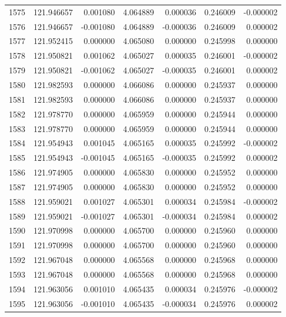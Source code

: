 \begin{tabular}{rrrrrrr}
1575 & 121.946657 &    0.001080 &  4.064889 &   0.000036 &   0.246009 & -0.000002 \\
1576 & 121.946657 &   -0.001080 &  4.064889 &  -0.000036 &   0.246009 &  0.000002 \\
1577 & 121.952415 &    0.000000 &  4.065080 &   0.000000 &   0.245998 &  0.000000 \\
1578 & 121.950821 &    0.001062 &  4.065027 &   0.000035 &   0.246001 & -0.000002 \\
1579 & 121.950821 &   -0.001062 &  4.065027 &  -0.000035 &   0.246001 &  0.000002 \\
1580 & 121.982593 &    0.000000 &  4.066086 &   0.000000 &   0.245937 &  0.000000 \\
1581 & 121.982593 &    0.000000 &  4.066086 &   0.000000 &   0.245937 &  0.000000 \\
1582 & 121.978770 &    0.000000 &  4.065959 &   0.000000 &   0.245944 &  0.000000 \\
1583 & 121.978770 &    0.000000 &  4.065959 &   0.000000 &   0.245944 &  0.000000 \\
1584 & 121.954943 &    0.001045 &  4.065165 &   0.000035 &   0.245992 & -0.000002 \\
1585 & 121.954943 &   -0.001045 &  4.065165 &  -0.000035 &   0.245992 &  0.000002 \\
1586 & 121.974905 &    0.000000 &  4.065830 &   0.000000 &   0.245952 &  0.000000 \\
1587 & 121.974905 &    0.000000 &  4.065830 &   0.000000 &   0.245952 &  0.000000 \\
1588 & 121.959021 &    0.001027 &  4.065301 &   0.000034 &   0.245984 & -0.000002 \\
1589 & 121.959021 &   -0.001027 &  4.065301 &  -0.000034 &   0.245984 &  0.000002 \\
1590 & 121.970998 &    0.000000 &  4.065700 &   0.000000 &   0.245960 &  0.000000 \\
1591 & 121.970998 &    0.000000 &  4.065700 &   0.000000 &   0.245960 &  0.000000 \\
1592 & 121.967048 &    0.000000 &  4.065568 &   0.000000 &   0.245968 &  0.000000 \\
1593 & 121.967048 &    0.000000 &  4.065568 &   0.000000 &   0.245968 &  0.000000 \\
1594 & 121.963056 &    0.001010 &  4.065435 &   0.000034 &   0.245976 & -0.000002 \\
1595 & 121.963056 &   -0.001010 &  4.065435 &  -0.000034 &   0.245976 &  0.000002 \\

\end{tabular}
